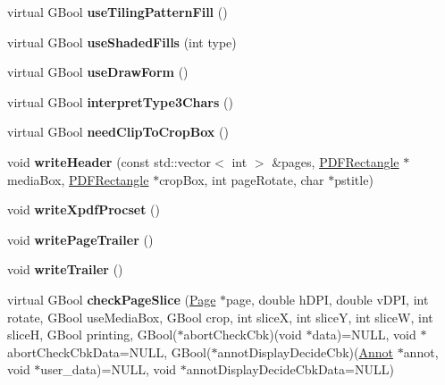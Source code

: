 \begin{DoxyCompactItemize}
virtual G\+Bool {\bfseries use\+Tiling\+Pattern\+Fill} ()
\item 
\mbox{\label{class_p_s_output_dev_ac160c4018c308bd00ac1c4b4e2504e4e}} 
virtual G\+Bool {\bfseries use\+Shaded\+Fills} (int type)
\item 
\mbox{\label{class_p_s_output_dev_a3f24b14254e8728b22ca8ce0a5ddf1ba}} 
virtual G\+Bool {\bfseries use\+Draw\+Form} ()
\item 
\mbox{\label{class_p_s_output_dev_a6dcf62b3673d603477689fca2148d3d6}} 
virtual G\+Bool {\bfseries interpret\+Type3\+Chars} ()
\item 
\mbox{\label{class_p_s_output_dev_aefdbeeb96eb0058a3e1ab00a608bf185}} 
virtual G\+Bool {\bfseries need\+Clip\+To\+Crop\+Box} ()
\item 
\mbox{\label{class_p_s_output_dev_a58e2d4a15d9c6db1aa791b5641ec4d01}} 
void {\bfseries write\+Header} (const std\+::vector$<$ int $>$ \&pages, \hyperlink{class_p_d_f_rectangle}{P\+D\+F\+Rectangle} $\ast$media\+Box, \hyperlink{class_p_d_f_rectangle}{P\+D\+F\+Rectangle} $\ast$crop\+Box, int page\+Rotate, char $\ast$pstitle)
\item 
\mbox{\label{class_p_s_output_dev_a752ddd3da9a762eda2b46e9283e89414}} 
void {\bfseries write\+Xpdf\+Procset} ()
\item 
\mbox{\label{class_p_s_output_dev_a915beba673783542a0196f6ccb012d6e}} 
void {\bfseries write\+Page\+Trailer} ()
\item 
\mbox{\label{class_p_s_output_dev_a87fec6fb4ed082675531799504321f00}} 
void {\bfseries write\+Trailer} ()
\item 
\mbox{\label{class_p_s_output_dev_a808dec15f4c479dc296c8b28b41f43c1}} 
virtual G\+Bool {\bfseries check\+Page\+Slice} (\hyperlink{class_page}{Page} $\ast$page, double h\+D\+PI, double v\+D\+PI, int rotate, G\+Bool use\+Media\+Box, G\+Bool crop, int sliceX, int sliceY, int sliceW, int sliceH, G\+Bool printing, G\+Bool($\ast$abort\+Check\+Cbk)(void $\ast$data)=N\+U\+LL, void $\ast$abort\+Check\+Cbk\+Data=N\+U\+LL, G\+Bool($\ast$annot\+Display\+Decide\+Cbk)(\hyperlink{class_annot}{Annot} $\ast$annot, void $\ast$user\+\_\+data)=N\+U\+LL, void $\ast$annot\+Display\+Decide\+Cbk\+Data=N\+U\+LL)

\end{DoxyCompactItemize}
